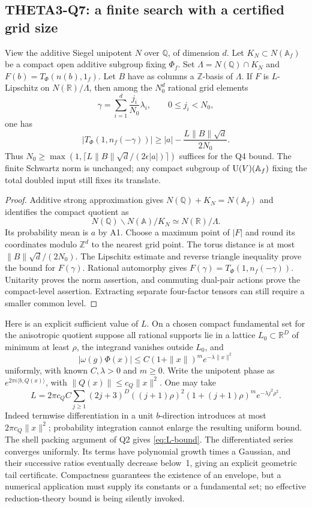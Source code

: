 \documentclass[11pt]{article}
\newcommand{\Q}{\mathbb Q}\newcommand{\C}{\mathbb C}\newcommand{\Z}{\mathbb Z}\newcommand{\R}{\mathbb R}\newcommand{\A}{\mathbb A}\newcommand{\OO}{\mathcal O}
\theoremstyle{definition}\newtheorem{definition}[theorem]{Definition}\newtheorem{remark}[theorem]{Remark}
\begin{document}
\subsection{THETA3-Q7: a finite search with a certified grid size}\label{Q7}
View the additive Siegel unipotent $N$ over $\Q$, of dimension $d$. Let $K_N\subset N(\A_f)$ be a compact open additive subgroup fixing $\Phi_f$. Set
$\Lambda=N(\Q)\cap K_N$ and
$F(b)=T_\Phi(n(b),1_f)$. Let $B$ have as columns a $\Z$-basis of $\Lambda$. If $F$ is $L$-Lipschitz on $N(\R)/\Lambda$, then among the $N_0^d$ rational grid elements
\[
 \gamma=\sum_{i=1}^d\frac{j_i}{N_0}\lambda_i,
 \qquad 0\leq j_i<N_0,
\]
one has
\begin{equation}\label{eq:grid}
 |T_\Phi(1,n_f(-\gamma))|
 \geq |a|-\frac{L\|B\|\sqrt d}{2N_0}.
\end{equation}
Thus $N_0\geq\max(1,\lceil L\|B\|\sqrt d/(2\epsilon|a|)\rceil)$ suffices for the Q4 bound. The finite Schwartz norm is unchanged; any compact subgroup of $\U(V)(\A_f)$ fixing the total doubled input still fixes its translate.
\begin{proof}
Additive strong approximation gives $N(\Q)+K_N=N(\A_f)$ and identifies
the compact quotient as
\[
 N(\Q)\backslash N(\A)/K_N \simeq N(\R)/\Lambda.
\]
Its probability mean is $a$ by A1. Choose a maximum point of $|F|$ and round its coordinates modulo $\Z^d$ to the nearest grid point. The torus distance is at most $\|B\|\sqrt d/(2N_0)$. The Lipschitz estimate and reverse triangle inequality prove the bound for $F(\gamma)$. Rational automorphy gives $F(\gamma)=T_\Phi(1,n_f(-\gamma))$. Unitarity proves the norm assertion, and commuting dual-pair actions prove the compact-level assertion. Extracting separate four-factor tensors can still require a smaller common level.
\end{proof}
Here is an explicit sufficient value of $L$. On a chosen compact fundamental set for the anisotropic quotient suppose all rational supports lie in a lattice $L_0\subset\R^D$ of minimum at least $\rho$, the integrand vanishes outside $L_0$, and
\[
 |\omega(g)\Phi(x)|\leq C(1+\|x\|)^m e^{-\lambda\|x\|^2}
\]
uniformly, with known $C,\lambda>0$ and $m\geq0$. Write the unipotent phase as $e^{2\pi i\langle b,Q(x)\rangle}$, with
$\|Q(x)\|\leq c_Q\|x\|^2$. One may take
\begin{equation}\label{eq:L-bound}
 L=2\pi c_Q C\sum_{j\geq1}(2j+3)^D((j+1)\rho)^2
       (1+(j+1)\rho)^m e^{-\lambda j^2\rho^2}.
\end{equation}
Indeed termwise differentiation in a unit $b$-direction introduces at most $2\pi c_Q\|x\|^2$; probability integration cannot enlarge the resulting uniform bound. The shell packing argument of Q2 gives \eqref{eq:L-bound}. The differentiated series converges uniformly. Its terms have polynomial growth times a Gaussian, and their successive ratios eventually decrease below~1, giving an explicit geometric tail certificate. Compactness guarantees the existence of an envelope, but a numerical application must supply its constants or a fundamental set; no effective reduction-theory bound is being silently invoked.
\end{document}
